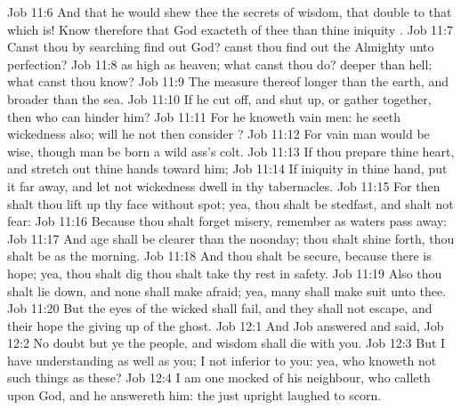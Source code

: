 \vs Job 11:6 And that he would shew thee the secrets of wisdom, that  double to that which is! Know therefore that God exacteth of thee  than thine iniquity .
\vs Job 11:7 Canst thou by searching find out God? canst thou find out the Almighty unto perfection?
\vs Job 11:8  as high as heaven; what canst thou do? deeper than hell; what canst thou know?
\vs Job 11:9 The measure thereof  longer than the earth, and broader than the sea.
\vs Job 11:10 If he cut off, and shut up, or gather together, then who can hinder him?
\vs Job 11:11 For he knoweth vain men: he seeth wickedness also; will he not then consider ?
\vs Job 11:12 For vain man would be wise, though man be born  a wild ass's colt.
\vs Job 11:13 If thou prepare thine heart, and stretch out thine hands toward him;
\vs Job 11:14 If iniquity  in thine hand, put it far away, and let not wickedness dwell in thy tabernacles.
\vs Job 11:15 For then shalt thou lift up thy face without spot; yea, thou shalt be stedfast, and shalt not fear:
\vs Job 11:16 Because thou shalt forget  misery,  remember  as waters  pass away:
\vs Job 11:17 And  age shall be clearer than the noonday; thou shalt shine forth, thou shalt be as the morning.
\vs Job 11:18 And thou shalt be secure, because there is hope; yea, thou shalt dig  thou shalt take thy rest in safety.
\vs Job 11:19 Also thou shalt lie down, and none shall make  afraid; yea, many shall make suit unto thee.
\vs Job 11:20 But the eyes of the wicked shall fail, and they shall not escape, and their hope  the giving up of the ghost.
\vs Job 12:1 And Job answered and said,
\vs Job 12:2 No doubt but ye  the people, and wisdom shall die with you.
\vs Job 12:3 But I have understanding as well as you; I  not inferior to you: yea, who knoweth not such things as these?
\vs Job 12:4 I am  one mocked of his neighbour, who calleth upon God, and he answereth him: the just upright  laughed to scorn.

